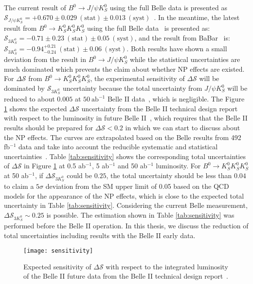 The current result of  $B^0 \to J/\psi K_S^0$ using the full Belle data is presented as $\mathcal{S}_{J/\psi K^0_S} = + 0.670 \pm 0.029~(\text{stat}) \pm 0.013~(\text{syst})$~\cite{b2book}. In the meantime, the latest result from $B^0 \to K_S^0  K_S^0  K_S^0$ using the full Belle data~\cite{kang2020measurement} is presented as: $\mathcal{S}_{3K^0_S} = - 0.71 \pm 0.23~(\text{stat}) \pm 0.05~(\text{syst})$, and the result from BaBar~\cite{Lees:2011nf} is: $\mathcal{S}_{ 3K^0_S} = - 0.94 ^{+0.21}_{-0.24}~(\text{stat}) \pm 0.06~(\text{syst})$. Both results have shown a small deviation from the result in $B^0 \to J/\psi K_S^0$ while the statistical uncertainties are much dominated which prevents the claim about whether NP effects are existed. For $\Delta \mathcal{S}$ from $B^0 \to K_S^0  K_S^0  K_S^0$, the experimental sensitivity of $\Delta \mathcal{S}$ will be dominated by $\mathcal{S}_{3K^0_S}$ uncertainty because the total uncertainty from $J/\psi K^0_S$ will be reduced to about $0.005$ at $50 \: \text{ab}^{-1}$ Belle II data~\cite{b2book}, which is negligible. The Figure \ref{fig:sensitivity} shows the expected $\Delta \mathcal{S}$ uncertainty from the Belle II technical design report with respect to the luminosity in future Belle II~\cite{Abe:2010gxa}, which requires that the Belle II results should be prepared for $\Delta \mathcal{S} < 0.2$ in which we can start to discuss about the NP effects. The curves are extrapolated based on the Belle results from 492 fb$^{-1}$ data and take into account the reducible systematic and statistical uncertainties~\cite{aushev2010physics}. Table \ref{tab:sensitivity} shows the corresponding total uncertainties of $\Delta \mathcal{S}$ in Figure \ref{fig:sensitivity} at 0.5 ab$^{-1}$, 5 ab$^{-1}$ and 50 ab$^{-1}$ luminosity. For $B^0 \to K_S^0  K_S^0  K_S^0$ at 50 ab$^{-1}$, if $\Delta \mathcal{S}_{3K^0_S}$  could be $0.25$, the total uncertainty should be less than $0.04$ to claim a $5\sigma$ deviation from the SM upper limit of 0.05 based on the QCD models for the appearance of the NP effects, which is close to the expected total uncertainty in Table \ref{tab:sensitivity}. Considering the current Belle measurement, $\Delta \mathcal{S}_{3K^0_S}\sim0.25$ is possible. The estimation shown in Table \ref{tab:sensitivity} was performed before the Belle II operation. In this thesis, we discuss the reduction of total uncertainties including results with the Belle II early data.
\begin{figure}[htpb]
	\centering
	\texttt{[image: sensitivity]}
	\caption{Expected  sensitivity of $\Delta \mathcal{S}$ with respect to the integrated luminosity of the Belle II future data from the Belle II technical design report~\cite{Abe:2010gxa}.}
	\label{fig:sensitivity}
\end{figure}

